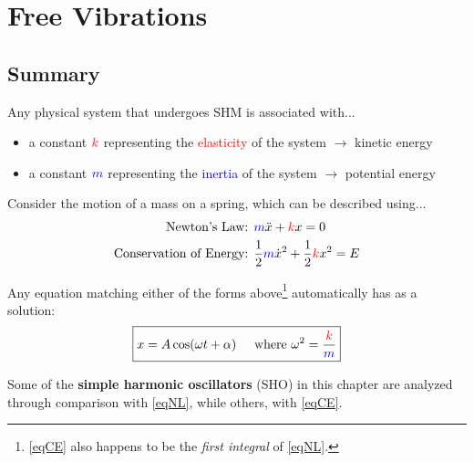 \documentclass[11pt,letterpaper,titlepage,oneside]{book}
\newcommand{\htab}{\hspace{0.5cm}}
\newcommand{\where}{\htab\text{where }}
\begin{document}
\chapter{Free Vibrations}

\section{Summary}
Any physical system that undergoes SHM is associated with...
\begin{itemize}
	\item a constant $\color{red}{k}$ representing the \textcolor{red}{elasticity} of the system $\longrightarrow$ kinetic energy
	\item a constant $\color{blue}{m}$ representing the \textcolor{blue}{inertia} of the system $\longrightarrow$ potential energy
\end{itemize}

Consider the motion of a mass on a spring, which can be described using...
\begin{align}
	\text{Newton's Law: }&
	\textcolor{blue}{m}\ddot{x} + \textcolor{red}{k}x = 0 \label{eqNL} \\
	\text{Conservation of Energy: }&
	\frac{1}{2}\textcolor{blue}{m}\dot{x}^2 + \frac{1}{2}\textcolor{red}{k}x^2 = E \label{eqCE}
\end{align}

Any equation matching either of the forms above\footnote{\eqref{eqCE} also happens to be the \textit{first integral} of  \eqref{eqNL}.} automatically has as a solution:
\begin{equation}
\boxed{x = A \cos(\omega t+\alpha)\where\omega^2 = \frac{\color{red}{k}}{\color{blue}m}} \label{eqSHMsoln}
\end{equation}

Some of the \textbf{simple harmonic oscillators} (SHO) in this chapter are analyzed through comparison with \eqref{eqNL}, while others, with \eqref{eqCE}.
\end{document}
